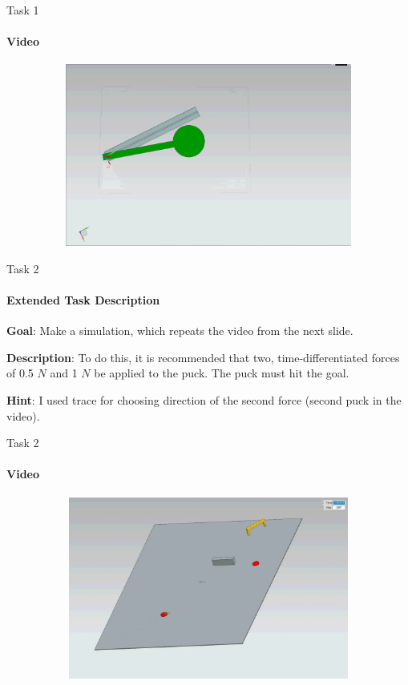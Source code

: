 \documentclass[aspectratio=169]{beamer}
\begin{document}
\begin{frame}[t]{Task 1}
    \framesubtitle{Video}
    \vspace{-0.6cm}
    \begin{figure}[H]
        \href{https://disk.yandex.ru/i/-vrZe2tMoOiVMQ}{
            \centering\includegraphics[height=6cm,width=1\textwidth,keepaspectratio]{1_preview.png}}
        \label{fig:1_preview.png}
    \end{figure}
\end{frame}


\begin{frame}[t]{Task 2}
    \framesubtitle{Extended Task Description}
    \textbf{Goal}: Make a simulation, which repeats the video from the next slide.
    \smallskip

    \textbf{Description}: To do this, it is recommended that two, time-differentiated forces of 0.5 $N$ and 1 $N$ be applied to the puck. The puck must hit the goal.

    \textbf{Hint}: I used trace for choosing direction of the second force (second puck in the video).
\end{frame}

\begin{frame}[t]{Task 2}
    \framesubtitle{Video}
    \vspace{-0.6cm}
    \begin{figure}[H]
        \href{https://disk.yandex.ru/i/iwNthKk0RIUtEg}{
            \centering\includegraphics[height=6cm,width=1\textwidth,keepaspectratio]{2_preview.png}}
        \label{fig:2_preview.png}
    \end{figure}
\end{frame}
\end{document}
